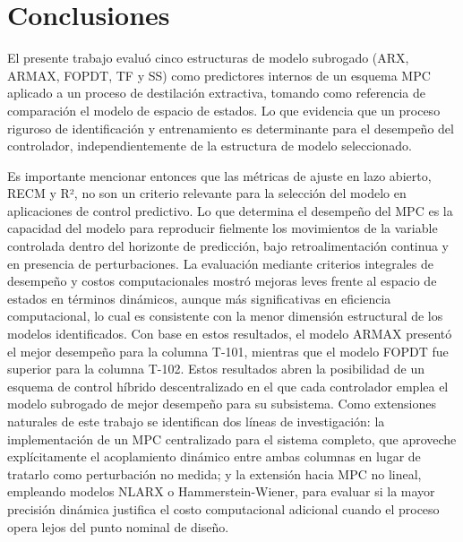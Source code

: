 \section{Conclusiones}

El presente trabajo evaluó cinco estructuras de modelo subrogado (ARX, ARMAX, FOPDT, TF y SS) como predictores internos de un esquema MPC aplicado a un proceso de destilación extractiva, tomando como referencia de comparación el modelo de espacio de estados. Lo que evidencia que un proceso riguroso de identificación y entrenamiento es determinante para el desempeño del controlador, independientemente de la estructura de modelo seleccionado.

\vspace{0.25cm}

Es importante mencionar entonces que las métricas de ajuste en lazo abierto, RECM y R², no son un criterio relevante para la selección del modelo en aplicaciones de control predictivo. Lo que determina el desempeño del MPC es la capacidad del modelo para reproducir fielmente los movimientos de la variable controlada dentro del horizonte de predicción, bajo retroalimentación continua y en presencia de perturbaciones. La evaluación mediante criterios integrales de desempeño y costos computacionales mostró mejoras leves frente al espacio de estados en términos dinámicos, aunque más significativas en eficiencia computacional, lo cual es consistente con la menor dimensión estructural de los modelos identificados. Con base en estos resultados, el modelo ARMAX presentó el mejor desempeño para la columna T-101, mientras que el modelo FOPDT fue superior para la columna T-102.
Estos resultados abren la posibilidad de un esquema de control híbrido descentralizado en el que cada controlador emplea el modelo subrogado de mejor desempeño para su subsistema. Como extensiones naturales de este trabajo se identifican dos líneas de investigación: la implementación de un MPC centralizado para el sistema completo, que aproveche explícitamente el acoplamiento dinámico entre ambas columnas en lugar de tratarlo como perturbación no medida; y la extensión hacia MPC no lineal, empleando modelos NLARX o Hammerstein-Wiener, para evaluar si la mayor precisión dinámica justifica el costo computacional adicional cuando el proceso opera lejos del punto nominal de diseño.